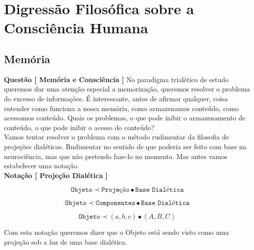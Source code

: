 
\section{Digressão Filosófica sobre a Consciência Humana}

\hspace{\baselineskip}

\subsection{Memória}

\hspace{\baselineskip}

\textbf{Questão [ Memória e Consciência ]} No paradigma trialético de estudo queremos dar uma atenção especial a memorização, queremos resolver o problema do excesso de informações. É interessante, antes de afirmar qualquer, coisa entender como funciona a nossa memória, como armazenamos conteúdo, como acessamos conteúdo. Quais os problemas, o que pode inibir o armazenamento de conteúdo, o que pode inibir o acesso do conteúdo?\\

Vamos tentar resolver o problema com o método rudimentar da filosofia de projeções dialéticas. Rudimentar no sentido de que poderia ser feito com base na neurociência, mas que não pretendo faze-lo no momento. Mas antes vamos estabelecer uma notação.\\

\textbf{Notação [ Projeção Dialética ]} 

$$ \texttt{Objeto} \prec \texttt{Projeção} \bullet \texttt{Base Dialética} $$

$$ \texttt{Objeto} \prec \texttt{Componentes} \bullet \texttt{Base Dialética} $$

$$ \texttt{Objeto} \prec (a,b,c) \bullet (A,B,C) $$

Com esta notação queremos dizer que o Objeto está sendo visto como uma projeção sob a luz de uma base dialética.

